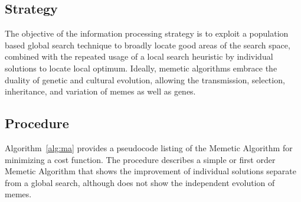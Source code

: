 \subsection{Strategy}
The objective of the information processing strategy is to exploit a population based global search technique to broadly locate good areas of the search space, combined with the repeated usage of a local search heuristic by individual solutions to locate local optimum.
Ideally, memetic algorithms embrace the duality of genetic and cultural evolution, allowing the transmission, selection, inheritance, and variation of memes as well as genes.

\subsection{Procedure}
Algorithm~\ref{alg:ma} provides a pseudocode listing of the Memetic Algorithm for minimizing a cost function. The procedure describes a simple or first order Memetic Algorithm that shows the improvement of individual solutions separate from a global search, although does not show the independent evolution of memes. 

